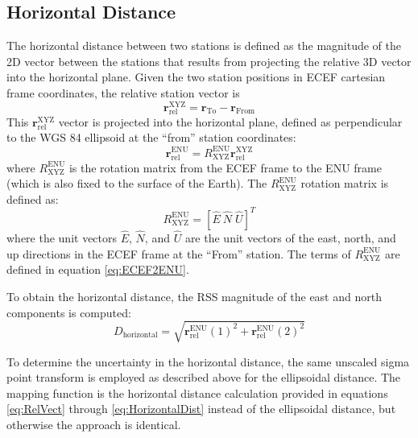 \subsection{Horizontal Distance}

The horizontal distance between two stations is defined as the magnitude of the 2D vector between the stations that results from projecting the relative 3D vector into the horizontal plane.  Given the two station positions in ECEF cartesian frame coordinates, the relative station vector is
\begin{equation} \label{eq:RelVect}
\boldsymbol{r}_{\text{rel}}^{\text{XYZ}} = \boldsymbol{r}_{\text{To}} - \boldsymbol{r}_{\text{From}}
\end{equation}
This $\boldsymbol{r}_{\text{rel}}^{\text{XYZ}}$ vector is projected into the horizontal plane, defined as perpendicular to the WGS 84 ellipsoid at the ``from'' station coordinates:
\begin{equation}
\boldsymbol{r}_{\text{rel}}^{\text{ENU}} = R_{\text{XYZ}}^{\text{ENU}} \boldsymbol{r}_{\text{rel}}^{\text{XYZ}}
\end{equation}
where $R_{\text{XYZ}}^{\text{ENU}}$ is the rotation matrix from the ECEF frame to the ENU frame (which is also fixed to the surface of the Earth). The $R_{\text{XYZ}}^{\text{ENU}}$ rotation matrix is defined as:
\begin{equation}
R_{\text{XYZ}}^{\text{ENU}} = \left[ \hat{E} \: \hat{N} \; \hat{U} \right]^T
\end{equation}
where the unit vectors $\hat{E}$, $\hat{N}$, and $\hat{U}$ are the unit vectors of the east, north, and up directions in the ECEF frame at the ``From'' station. The terms of $R_{\text{XYZ}}^{\text{ENU}}$ are defined in equation \ref{eq:ECEF2ENU}. 

To obtain the horizontal distance, the RSS magnitude of the east and north components is computed:
\begin{equation} \label{eq:HorizontalDist}
D_{\text{horizontal}} = \sqrt{\boldsymbol{r}_{\text{rel}}^{\text{ENU}}(1)^2 + \boldsymbol{r}_{\text{rel}}^{\text{ENU}}(2)^2}
\end{equation}

To determine the uncertainty in the horizontal distance, the same unscaled sigma point transform is employed as described above for the ellipsoidal distance. The mapping function is the horizontal distance calculation provided in equations \ref{eq:RelVect} through \ref{eq:HorizontalDist} instead of the ellipsoidal distance, but otherwise the approach is identical.
